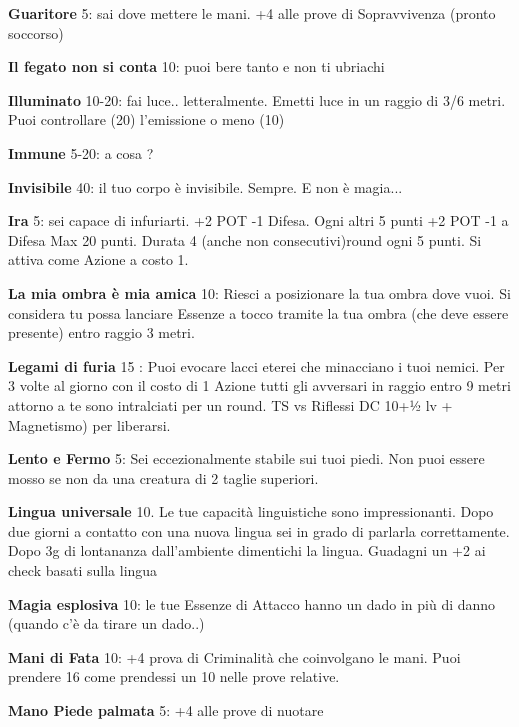 \documentclass[a4paper,11pt,twoside,openany]{book}
\begin{document}
\textbf{Guaritore} 5: sai dove mettere le mani. +4 alle prove di Sopravvivenza (pronto soccorso)

\textbf{Il fegato non si conta} 10: puoi bere tanto e non ti ubriachi

\textbf{Illuminato} 10-20: fai luce.. letteralmente. Emetti luce in un raggio di 3/6 metri. Puoi controllare (20) l'emissione o meno (10)

\textbf{Immune} 5-20: a cosa ?

\textbf{Invisibile} 40: il tuo corpo è invisibile. Sempre. E non è magia...

\textbf{Ira} 5: sei capace di infuriarti. +2 POT -1 Difesa. Ogni altri 5 punti +2 POT -1 a Difesa Max 20 punti. Durata 4 (anche non consecutivi)round ogni 5 punti. Si attiva come Azione a costo 1.

\textbf{La mia ombra è mia amica} 10: Riesci a posizionare la tua ombra dove vuoi. Si considera tu possa lanciare Essenze a tocco tramite la tua ombra (che deve essere presente) entro raggio 3 metri.

\textbf{Legami di furia} 15 : Puoi evocare lacci eterei che minacciano i tuoi nemici. Per 3 volte al giorno con il costo di 1 Azione tutti gli avversari in raggio entro 9 metri attorno a te sono intralciati per un round. TS vs Riflessi DC 10+½ lv + Magnetismo) per liberarsi.

\textbf{Lento e Fermo} 5: Sei eccezionalmente stabile sui tuoi piedi. Non puoi essere mosso se non da una creatura di 2 taglie superiori.

\textbf{Lingua universale} 10. Le tue capacità linguistiche sono impressionanti. Dopo due giorni a contatto con una nuova lingua sei in grado di parlarla correttamente. Dopo 3g di lontananza dall'ambiente dimentichi la lingua. Guadagni un +2 ai check basati sulla lingua

\textbf{Magia esplosiva} 10: le tue Essenze di Attacco hanno un dado in più di danno (quando c'è da tirare un dado..)

\textbf{Mani di Fata} 10: +4 prova di Criminalità che coinvolgano le mani. Puoi prendere 16 come prendessi un 10 nelle prove relative.

\textbf{Mano Piede palmata} 5: +4 alle prove di nuotare
\end{document}
